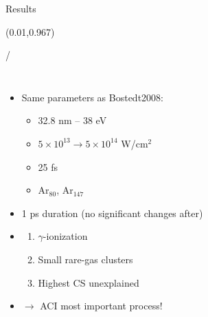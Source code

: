 \documentclass{beamer}
\makeatletter
\newcommand{\framenumber}{
\begin{textblock}{0}(0.01,0.967)
\begin{scriptsize}
{\color{gray}\insertframenumber/\inserttotalframenumber}
\end{scriptsize}
\end{textblock}
}
\makeatother
\begin{document}
\begin{frame}{Results}\framenumber


\begin{columns}
		\begin{itemize}
		\item Same parameters as Bostedt2008:
		\begin{itemize}
			\item 32.8 nm -- 38 eV
			\item $5\times10^{13} \rightarrow 5\times10^{14}$ W/cm$^2$
			\item 25 fs
			\item Ar$_{80}$, Ar$_{147}$
		\end{itemize}
		\item 1 ps duration (no significant changes after)
        \item \begin{enumerate}
               \item $\gamma$-ionization
               \item Small rare-gas clusters
               \item Highest CS unexplained
              \end{enumerate}
        \item<6-> {\color{red}$\rightarrow$ ACI most important process!}
		\end{itemize}

\begin{center}


\end{center}
\end{columns}
\end{frame}
\end{document}
